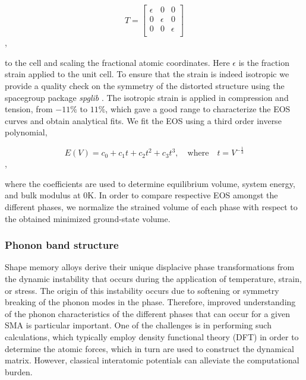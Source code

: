 \documentclass[preprint,colorlinks=true,linkcolor=black,citecolor=black]{elsarticle}
\begin{document}
\begin{equation}
	\label{eq:isotropic_strain}
	T=\begin{bmatrix}
		\epsilon & 0        & 0        \\
		0        & \epsilon & 0        \\
		0        & 0        & \epsilon \\
	\end{bmatrix}
\end{equation},

to the cell and scaling the fractional atomic coordinates. Here
$\epsilon$ is the fraction strain applied to the unit cell. To ensure
that the strain is indeed isotropic we provide a quality check on the
symmetry of the distorted structure using the spacegroup package
\textit{spglib} \cite{Togo2018}. The isotropic strain is applied in
compression and tension, from $-11\%$ to $11\%$, which gave a good
range to characterize the EOS curves and obtain analytical fits. We
fit the EOS using a third order inverse polynomial,

\begin{equation}
	\label{eq:eos_fit}
	E(V) = c_0 + c_1 t + c_2 t^2 + c_3 t^3, \quad \text{where} \quad t = V^{-\frac{1}{3}}
\end{equation},

where the coefficients are used to determine equilibrium volume,
system energy, and bulk modulus \cite{Alchagirov2003} at 0K. In order
to compare respective EOS amongst the different phases, we normalize
the strained volume of each phase with respect to the obtained
minimized ground-state volume. \par

\subsubsection{Phonon band structure}

Shape memory alloys derive their unique displacive phase
transformations from the dynamic instability that occurs during the
application of temperature, strain, or stress. The origin of this
instability occurs due to softening or symmetry breaking of the phonon
modes in the phase. Therefore, improved understanding of the phonon
characteristics of the different phases that can occur for a given SMA
is particular important. One of the challenges is in performing such
calculations, which typically employ density functional theory (DFT)
in order to determine the atomic forces, which in turn are used to
construct the dynamical matrix. However, classical interatomic
potentials can alleviate the computational burden. \par
\end{document}
